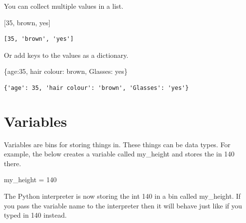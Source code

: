 \documentclass[
  letterpaper,
  DIV=11,
  numbers=noendperiod]{scrreprt}
\newenvironment{Shaded}{\begin{snugshade}}{\end{snugshade}}
\newcommand{\DecValTok}[1]{\textcolor[rgb]{0.68,0.00,0.00}{#1}}
\newcommand{\NormalTok}[1]{\textcolor[rgb]{0.00,0.23,0.31}{#1}}
\newcommand{\OperatorTok}[1]{\textcolor[rgb]{0.37,0.37,0.37}{#1}}
\newcommand{\StringTok}[1]{\textcolor[rgb]{0.13,0.47,0.30}{#1}}
\begin{document}
You can collect multiple values in a list.

\begin{Shaded}
\begin{Highlighting}[]
\NormalTok{[}\DecValTok{35}\NormalTok{, }\StringTok{\textquotesingle{}brown\textquotesingle{}}\NormalTok{, }\StringTok{\textquotesingle{}yes\textquotesingle{}}\NormalTok{]}
\end{Highlighting}
\end{Shaded}

\begin{verbatim}
[35, 'brown', 'yes']
\end{verbatim}

Or add keys to the values as a dictionary.

\begin{Shaded}
\begin{Highlighting}[]
\NormalTok{\{}\StringTok{\textquotesingle{}age\textquotesingle{}}\NormalTok{:}\DecValTok{35}\NormalTok{, }\StringTok{\textquotesingle{}hair colour\textquotesingle{}}\NormalTok{: }\StringTok{\textquotesingle{}brown\textquotesingle{}}\NormalTok{, }\StringTok{\textquotesingle{}Glasses\textquotesingle{}}\NormalTok{: }\StringTok{\textquotesingle{}yes\textquotesingle{}}\NormalTok{\}}
\end{Highlighting}
\end{Shaded}

\begin{verbatim}
{'age': 35, 'hair colour': 'brown', 'Glasses': 'yes'}
\end{verbatim}


\hypertarget{variables}{%
\chapter{Variables}\label{variables}}

Variables are bins for storing things in. These things can be data
types. For example, the below creates a variable called my\_height and
stores the in 140 there.

\begin{Shaded}
\begin{Highlighting}[]
\NormalTok{my\_height }\OperatorTok{=} \DecValTok{140}
\end{Highlighting}
\end{Shaded}

The Python interpreter is now storing the int 140 in a bin called
my\_height. If you pass the variable name to the interpreter then it
will behave just like if you typed in 140 instead.
\end{document}
